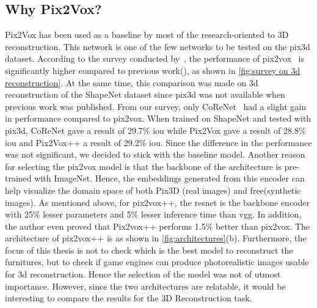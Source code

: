 \subsection{Why Pix2Vox?}\label{subsec:why-pix2vox?}
Pix2Vox has been used as a baseline by most of the research-oriented to 3D reconstruction.
This network is one of the few networks to be tested on the pix3d dataset.
According to the survey conducted by~\cite{Han2021ImageBased3O}, the performance of pix2vox~\cite{Xie_2019}
is significantly higher compared to previous work(\cite{DBLP:journals/corr/TulsianiZEM17,tatarchenko2016multiview,richter2018matryoshka,gwak2017weakly,8265323}), as shown in \autoref{fig:survey on 3d reconstruction}.
At the same time, this comparison was made on 3d reconstruction of the ShapeNet dataset since pix3d was not available when previous work was published.
From our survey, only CoReNet~\cite{popov2020corenet} had a slight gain in performance compared to pix2vox.
When trained on ShapeNet and tested with pix3d, CoReNet gave a result of 29.7\% \gls{iou} while Pix2Vox gave a result of 28.8\% \gls{iou}  and Pix2Vox++ a result of 29.2\% \gls{iou}\@.
Since the difference in the performance was not significant, we decided to stick with the baseline model.
Another reason for selecting the pix2vox model is that the backbone of the architecture is pre-trained with ImageNet.
Hence, the embeddings generated from this encoder can help visualize the domain space of both Pix3D (real images)  and \gls{free}(synthetic images).
As mentioned above, for pix2vox++, the \gls{resnet} is the backbone encoder with 25\% lesser parameters and 5\% lesser inference time than \gls{vgg}\@.
In addition, the author even proved that Pix2vox++ performs 1.5\% better than pix2vox.
The architecture of pix2vox++ is as shown in \autoref{fig:architectures}(b).
Furthermore, the focus of this thesis is not to check which is the best model to reconstruct the furnitures, but to check if game engines can produce photorealistic images usable for 3d reconstruction.
Hence the selection of the model was not of utmost importance.
However, since the two architectures are relatable, it would be interesting to compare the results for the 3D Reconstruction task.

%


